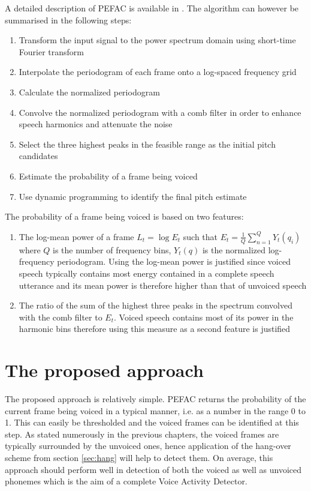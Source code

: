 A detailed description of PEFAC is available in \cite{PEFAC}. The algorithm can however be summarised in the following steps:
\begin{enumerate}
\item Transform the input signal to the power spectrum domain using short-time Fourier transform
\item Interpolate the periodogram of each frame onto a log-spaced frequency grid
\item Calculate the normalized periodogram
\item Convolve the normalized periodogram with a comb filter in order to enhance speech harmonics and attenuate the noise
\item Select the three highest peaks in the feasible range as the initial pitch candidates
\item Estimate the probability of a frame being voiced
\item Use dynamic programming to identify the final pitch estimate
\end{enumerate}

The probability of a frame being voiced is based on two features:
\begin{enumerate}
\item The log-mean power of a frame $L_t = \log E_t$ such that $E_t = \frac{1}{Q} \sum_{n=1}^{Q} Y_t(q_i)$ where $Q$ is the number of frequency bins, $Y_t(q)$ is the normalized log-frequency periodogram. Using the log-mean power is justified since voiced speech typically contains most energy contained in a complete speech utterance and its mean power is therefore higher than that of unvoiced speech
\item The ratio of the sum of the highest three peaks in the spectrum convolved with the comb filter to $E_t$. Voiced speech contains most of its power in the harmonic bins therefore using this measure as a second feature is justified
\end{enumerate}


\section{The proposed approach}

The proposed approach is relatively simple. PEFAC returns the probability of the current frame being voiced in a typical manner, i.e. as a number in the range 0 to 1. This can easily be thresholded and the voiced frames can be identified at this step. As stated numerously in the previous chapters, the voiced frames are typically surrounded by the unvoiced ones, hence application of the hang-over scheme from section \ref{sec:hang} will help to detect them. On average, this approach should perform well in detection of both the voiced as well as unvoiced phonemes which is the aim of a complete Voice Activity Detector.

